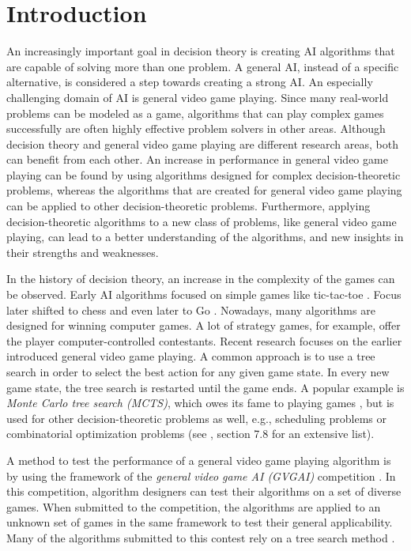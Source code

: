 \chapter{Introduction}
\label{sec:introduction}

An increasingly important goal in decision theory is creating AI algorithms that
are capable of solving more than one problem. A general AI, instead of a
specific alternative, is considered a step towards creating a strong AI.  An
especially challenging domain of AI is general video game playing.  Since many
real-world problems can be modeled as a game, algorithms that can play complex
games successfully are often highly effective problem solvers in other areas.
Although decision theory and general video game playing are different research
areas, both can benefit from each other.  An increase in performance in general
video game playing can be found by using algorithms designed for complex
decision-theoretic problems, whereas the algorithms that are created for general
video game playing can be applied to other decision-theoretic problems.
Furthermore, applying decision-theoretic algorithms to a new class of problems,
like general video game playing, can lead to a better understanding of the
algorithms, and new insights in their strengths and weaknesses. 

In the history of decision theory, an increase in the complexity of the games
can be observed. Early AI algorithms focused on simple games like tic-tac-toe
\cite{michie1968boxes}.  Focus later shifted to chess and even later to Go
\cite{sutton1998reinforcement, brugmann1993monte}.  Nowadays, many algorithms
are designed for winning computer games. A lot of strategy games, for example,
offer the player computer-controlled contestants.  Recent research focuses on
the earlier introduced general video game playing.  A common approach is to use
a tree search in order to select the best action for any given game state. In
every new game state, the tree search is restarted until the game ends.  A
popular example is \emph{Monte Carlo tree search (MCTS)}, which owes its fame to
playing games \cite{gelly2006modification}, but is used for other
decision-theoretic problems as well, e.g., scheduling problems or combinatorial
optimization problems (see \cite{browne2012survey}, section 7.8 for an
extensive list). 

A method to test the performance of a general video game playing algorithm is
by using the framework of the \emph{general video game AI (GVGAI)} competition
\cite{perez2014}. In this competition, algorithm designers can test their
algorithms on a set of diverse games. When submitted to the competition, the
algorithms are applied to an unknown set of games in the same framework to test
their general applicability. Many of the algorithms submitted to this contest
rely on a tree search method \cite{perez2015open, ross2014general,
agent2015torsten}.


